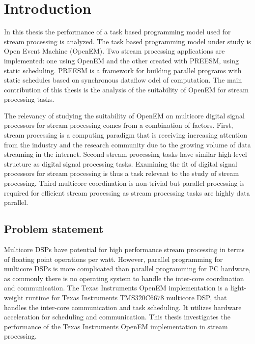 \chapter{Introduction}
\label{chapter:introduction}
In this thesis the performance of a task based programming model used for stream processing is analyzed. The task based programming model under study is Open Event Machine (OpenEM). Two stream processing applications are implemented: one using OpenEM and the other created with PREESM, using static scheduling. PREESM is a framework for building parallel programs with static schedules based on synchronous dataflow odel of computation. The main contribution of this thesis is the analysis of the suitability of OpenEM for stream processing tasks.

The relevancy of studying the suitability of OpenEM on multicore digital signal processors for stream processing comes from a combination of factors. First, stream processing is a computing paradigm that is receiving increasing attention from the industry and the research community due to the growing volume of data streaming in the internet. Second stream processing tasks have similar high-level structure as digital signal processing tasks. Examining the fit of digital signal processors for stream processing is thus a task relevant to the study of stream processing. Third multicore coordination is non-trivial but parallel processing is required for efficient stream processing as stream processing tasks are highly data parallel.

\section{Problem statement}
\label{section:problem-statement}
Multicore DSPs have potential for high performance stream processing in terms of floating point operations per watt. However, parallel programming for multicore DSPs is more complicated than parallel programming for PC hardware, as commonly there is no operating system to handle the inter-core coordination and communication. The Texas Instruments OpenEM implementation is a light-weight runtime for Texas Instruments TMS320C6678 multicore DSP, that handles the inter-core communication and task scheduling. It utilizes hardware acceleration for scheduling and communication. This thesis investigates the performance of the Texas Instruments OpenEM implementation in stream processing.

